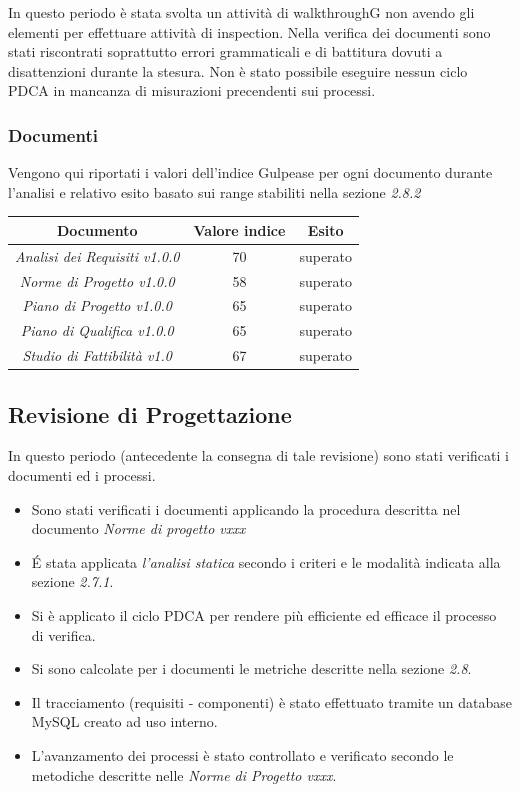 {In questo periodo è stata svolta un attività di walkthroughG non avendo gli elementi
per effettuare attività di inspection. Nella verifica dei documenti sono stati riscontrati soprattutto errori grammaticali e di battitura dovuti a disattenzioni durante la stesura.
Non è stato possibile eseguire nessun ciclo PDCA in mancanza di misurazioni precendenti sui processi.

\subsubsection{Documenti}
Vengono qui riportati i valori dell’indice Gulpease per ogni documento durante l’analisi e relativo
esito basato sui range stabiliti nella sezione \emph{2.8.2}
\begin{center}
  \begin{tabular}{|c|c|c|}
    \hline
    \textbf{Documento} & \textbf{Valore indice} & \textbf{Esito} \\
    \hline
    \emph{Analisi dei Requisiti v1.0.0}  & 70 & superato \\
    \hline
    \emph{Norme di Progetto v1.0.0}   & 58  & superato \\
    \hline
    \emph{Piano di Progetto v1.0.0}   & 65 & superato \\
    \hline
    \emph{Piano di Qualifica v1.0.0}   & 65 & superato \\
    \hline
    \emph{Studio di Fattibilità v1.0}  & 67 & superato \\
    \hline
  \end{tabular}
  \end{center}

\subsection{Revisione di Progettazione}
In questo periodo (antecedente la consegna di tale revisione) sono stati verificati i documenti ed i processi.

\begin{itemize}
\item Sono stati verificati i documenti applicando la procedura descritta nel documento \emph{Norme di progetto vxxx}
\item \'E stata applicata \emph{l'analisi statica} secondo i criteri e le modalità indicata alla sezione \emph{2.7.1}. 
\item Si è applicato il ciclo PDCA per rendere più efficiente ed efficace il processo di verifica.
\item Si sono calcolate per i documenti le metriche descritte nella sezione \emph{2.8}.
\item Il tracciamento (requisiti - componenti) è stato effettuato tramite un database MySQL creato ad uso interno.
\item L’avanzamento dei processi è stato controllato e verificato secondo le metodiche descritte nelle \emph{Norme di Progetto vxxx}.


\end{itemize}}
